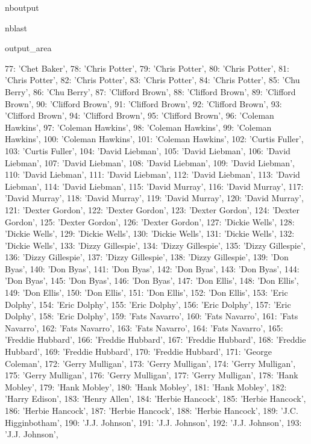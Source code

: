 \documentclass[letterpaper,10pt,english]{sphinxmanual}
\begin{document}
\begin{sphinxuseclass}{nboutput}
\begin{sphinxuseclass}{nblast}
{\begin{sphinxuseclass}{output_area}
\begin{sphinxuseclass}{}
\begin{sphinxVerbatim}[commandchars=\\\{\}]
 77: 'Chet Baker',
 78: 'Chris Potter',
 79: 'Chris Potter',
 80: 'Chris Potter',
 81: 'Chris Potter',
 82: 'Chris Potter',
 83: 'Chris Potter',
 84: 'Chris Potter',
 85: 'Chu Berry',
 86: 'Chu Berry',
 87: 'Clifford Brown',
 88: 'Clifford Brown',
 89: 'Clifford Brown',
 90: 'Clifford Brown',
 91: 'Clifford Brown',
 92: 'Clifford Brown',
 93: 'Clifford Brown',
 94: 'Clifford Brown',
 95: 'Clifford Brown',
 96: 'Coleman Hawkins',
 97: 'Coleman Hawkins',
 98: 'Coleman Hawkins',
 99: 'Coleman Hawkins',
 100: 'Coleman Hawkins',
 101: 'Coleman Hawkins',
 102: 'Curtis Fuller',
 103: 'Curtis Fuller',
 104: 'David Liebman',
 105: 'David Liebman',
 106: 'David Liebman',
 107: 'David Liebman',
 108: 'David Liebman',
 109: 'David Liebman',
 110: 'David Liebman',
 111: 'David Liebman',
 112: 'David Liebman',
 113: 'David Liebman',
 114: 'David Liebman',
 115: 'David Murray',
 116: 'David Murray',
 117: 'David Murray',
 118: 'David Murray',
 119: 'David Murray',
 120: 'David Murray',
 121: 'Dexter Gordon',
 122: 'Dexter Gordon',
 123: 'Dexter Gordon',
 124: 'Dexter Gordon',
 125: 'Dexter Gordon',
 126: 'Dexter Gordon',
 127: 'Dickie Wells',
 128: 'Dickie Wells',
 129: 'Dickie Wells',
 130: 'Dickie Wells',
 131: 'Dickie Wells',
 132: 'Dickie Wells',
 133: 'Dizzy Gillespie',
 134: 'Dizzy Gillespie',
 135: 'Dizzy Gillespie',
 136: 'Dizzy Gillespie',
 137: 'Dizzy Gillespie',
 138: 'Dizzy Gillespie',
 139: 'Don Byas',
 140: 'Don Byas',
 141: 'Don Byas',
 142: 'Don Byas',
 143: 'Don Byas',
 144: 'Don Byas',
 145: 'Don Byas',
 146: 'Don Byas',
 147: 'Don Ellis',
 148: 'Don Ellis',
 149: 'Don Ellis',
 150: 'Don Ellis',
 151: 'Don Ellis',
 152: 'Don Ellis',
 153: 'Eric Dolphy',
 154: 'Eric Dolphy',
 155: 'Eric Dolphy',
 156: 'Eric Dolphy',
 157: 'Eric Dolphy',
 158: 'Eric Dolphy',
 159: 'Fats Navarro',
 160: 'Fats Navarro',
 161: 'Fats Navarro',
 162: 'Fats Navarro',
 163: 'Fats Navarro',
 164: 'Fats Navarro',
 165: 'Freddie Hubbard',
 166: 'Freddie Hubbard',
 167: 'Freddie Hubbard',
 168: 'Freddie Hubbard',
 169: 'Freddie Hubbard',
 170: 'Freddie Hubbard',
 171: 'George Coleman',
 172: 'Gerry Mulligan',
 173: 'Gerry Mulligan',
 174: 'Gerry Mulligan',
 175: 'Gerry Mulligan',
 176: 'Gerry Mulligan',
 177: 'Gerry Mulligan',
 178: 'Hank Mobley',
 179: 'Hank Mobley',
 180: 'Hank Mobley',
 181: 'Hank Mobley',
 182: 'Harry Edison',
 183: 'Henry Allen',
 184: 'Herbie Hancock',
 185: 'Herbie Hancock',
 186: 'Herbie Hancock',
 187: 'Herbie Hancock',
 188: 'Herbie Hancock',
 189: 'J.C. Higginbotham',
 190: 'J.J. Johnson',
 191: 'J.J. Johnson',
 192: 'J.J. Johnson',
 193: 'J.J. Johnson',

\end{sphinxVerbatim}
\end{sphinxuseclass}
\end{sphinxuseclass}}
\end{sphinxuseclass}
\end{sphinxuseclass}
\end{document}
